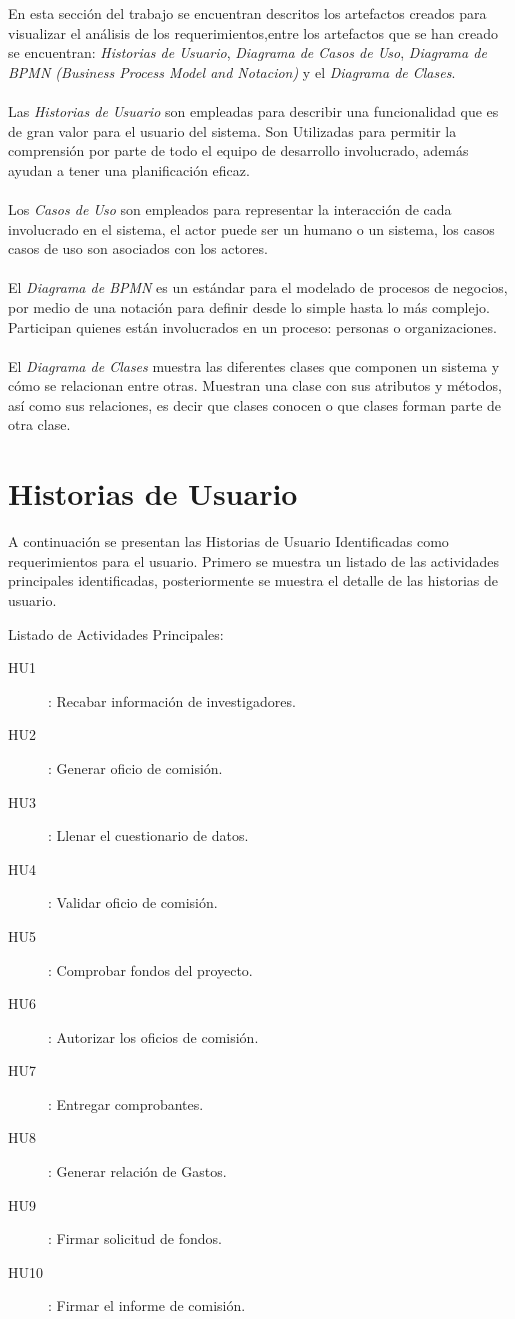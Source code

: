 \documentclass{report}
\begin{document}
    En esta sección del trabajo se encuentran descritos los artefactos creados para visualizar el análisis de los requerimientos,entre los artefactos que se han creado se encuentran: \emph{Historias de Usuario}, \emph{Diagrama de Casos de Uso}, \emph{Diagrama de BPMN (Business Process Model and Notacion)} y el \emph{Diagrama de Clases}.\\\\
    Las \emph{Historias de Usuario} son empleadas para describir una funcionalidad que es de gran valor para el usuario del sistema. Son Utilizadas para permitir la comprensión por parte de todo el equipo de desarrollo involucrado, además ayudan a tener una planificación eficaz.\\\\
    Los \emph{Casos de Uso} son empleados para representar la  interacción de cada involucrado en el sistema, el actor puede ser un humano o un sistema, los casos casos de uso son asociados con los actores.\\\\
    El \emph{Diagrama de BPMN} es un estándar para el modelado de procesos de negocios, por medio de una notación para definir desde lo simple hasta lo más complejo. Participan quienes están involucrados en un proceso: personas o organizaciones.\\\\
    El \emph{Diagrama de Clases} muestra las diferentes clases que componen un sistema y cómo se relacionan entre otras. Muestran una clase con sus atributos y métodos, así como sus relaciones, es decir que clases conocen o que clases forman parte de otra clase.
    
    \section{Historias de Usuario}\label{HU}
    A continuación se presentan las Historias de Usuario Identificadas como requerimientos para el usuario. Primero se muestra un listado de las actividades principales identificadas, posteriormente se muestra el detalle de las historias de usuario.
    
    Listado de Actividades Principales:
    \begin{description}
        \item[HU1]: Recabar información de investigadores.
        \item[HU2]: Generar oficio de comisión.
        \item[HU3]: Llenar el cuestionario de datos.
        \item[HU4]: Validar oficio de comisión.
        \item[HU5]: Comprobar fondos del proyecto.
        \item[HU6]: Autorizar los oficios de comisión.
        \item[HU7]: Entregar comprobantes.
        \item[HU8]: Generar relación de Gastos.
        \item[HU9]: Firmar solicitud de fondos.
        \item[HU10]: Firmar el informe de comisión.
    \end{description}
    
\end{document}
